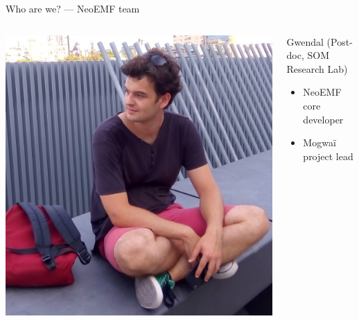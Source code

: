 \begin{frame}{Who are we? --- NeoEMF team}

\begin{columns}
\centering
\includegraphics[height=.25\textheight,clip,trim={0 4cm 0 0}]{biopic-05-gwendal}
\centering
\begin{block}{Gwendal (Post-doc, SOM Research Lab)}
\begin{itemize}
\item NeoEMF core developer
\item Mogwaï project lead
\end{itemize}
\end{block}
\end{columns}


\end{frame}
